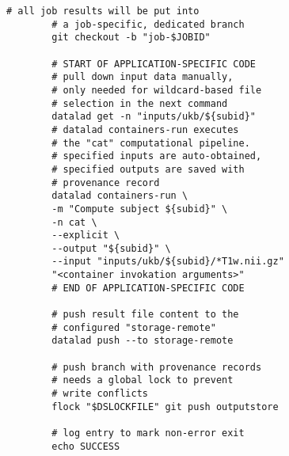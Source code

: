 \begin{Listing}
\begin{lstlisting}[multicols=2]
		# all job results will be put into
		# a job-specific, dedicated branch
		git checkout -b "job-$JOBID"

		# START OF APPLICATION-SPECIFIC CODE
		# pull down input data manually,
		# only needed for wildcard-based file
		# selection in the next command
		datalad get -n "inputs/ukb/${subid}"
		# datalad containers-run executes
		# the "cat" computational pipeline.
		# specified inputs are auto-obtained,
		# specified outputs are saved with
		# provenance record
		datalad containers-run \
		-m "Compute subject ${subid}" \
		-n cat \
		--explicit \
		--output "${subid}" \
		--input "inputs/ukb/${subid}/*T1w.nii.gz"
		"<container invokation arguments>"
		# END OF APPLICATION-SPECIFIC CODE

		# push result file content to the
		# configured "storage-remote"
		datalad push --to storage-remote

		# push branch with provenance records
		# needs a global lock to prevent
		# write conflicts
		flock "$DSLOCKFILE" git push outputstore

		# log entry to mark non-error exit
		echo SUCCESS
	\end{lstlisting}

	\caption[Job orchestration for parallel processing]{Complete compute job implementation as a bash script.
		A batch system invokes the job-script in a temporary working directory with three parameters:
		a URL of a DataLad dataset tracking all code and input data,
		a URL to deposit job-results at, and
		an identifier to select a sample for processing.
		Apart from performance-related optimizations, the job implementation conducts three main steps:
		1)~\texttt{clone} a DataLad dataset with all information to bootstrap an ephemeral computing environment for each job;
		2)~\texttt{containers-run} a containerized pipeline with a comprehensive specification of to-be-retrieved inputs and to-be-captured outputs;
		3)~\texttt{push} captured outputs and process provenance records to a permanent storage location.
		Preparation, computation, provenance record creation, and file content deposition on permanent storage are fully independent across jobs, and are executed in parallel.
		Only the \texttt{git push} of the provenance record to a central repository must be protected against concurrent write-access for technical reasons.
		Additional job parametrization (\texttt{DSLOCKFILE} and \texttt{JOBID} environment variables) are defined at job-submission using batch system specific means.
		The job script can be adjusted to a different processing pipeline by replacing the container invocation (see \texttt{APPLICATION-SPECIFIC CODE} markers).}
	\label{lst:job}
\end{Listing}


